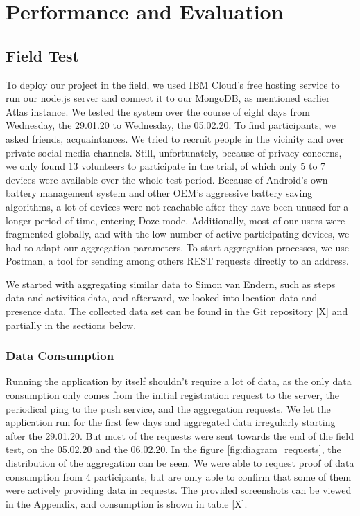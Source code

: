 
\chapter{Performance and Evaluation}\label{chapter:evaluation}
\section{Field Test}
To deploy our project in the field, we used IBM Cloud's free hosting service to run our node.js server and connect it to our MongoDB, as mentioned earlier Atlas instance. We tested the system over the course of eight days from Wednesday, the 29.01.20 to Wednesday, the 05.02.20. To find participants, we asked friends, acquaintances. We tried to recruit people in the vicinity and over private social media channels. Still, unfortunately, because of privacy concerns, we only found 13 volunteers to participate in the trial, of which only 5 to 7 devices were available over the whole test period. Because of Android's own battery management system and other OEM's aggressive battery saving algorithms, a lot of devices were not reachable after they have been unused for a longer period of time, entering Doze mode. Additionally, most of our users were fragmented globally, and with the low number of active participating devices, we had to adapt our aggregation parameters. To start aggregation processes, we use Postman, a tool for sending among others REST requests directly to an address.

We started with aggregating similar data to Simon van Endern, such as steps data and activities data, and afterward, we looked into location data and presence data. The collected data set can be found in the Git repository [X] and partially in the sections below.
\subsection{Data Consumption}
Running the application by itself shouldn't require a lot of data, as the only data consumption only comes from the initial registration request to the server, the periodical ping to the push service, and the aggregation requests. We let the application run for the first few days and aggregated data irregularly starting after the 29.01.20. But most of the requests were sent towards the end of the field test, on the 05.02.20 and the 06.02.20. In the figure \ref{fig:diagram_requests}, the distribution of the aggregation can be seen. We were able to request proof of data consumption from 4 participants, but are only able to confirm that some of them were actively providing data in requests. The provided screenshots can be viewed in the Appendix, and consumption is shown in table [X]. 

